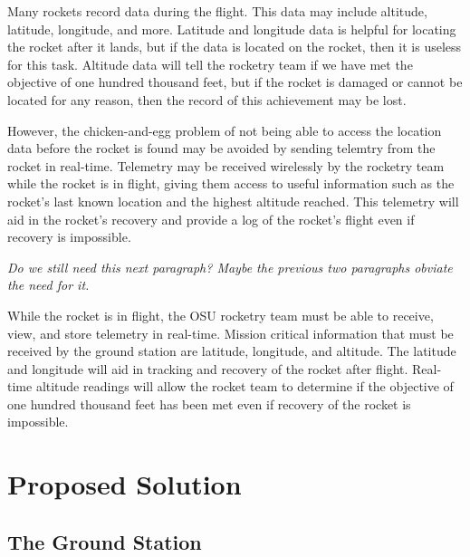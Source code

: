 \documentclass[10pt,journal,draftclsnofoot,onecolumn]{IEEEtran}
\begin{document}
	Many rockets record data during the flight. This data may include
	altitude, latitude, longitude, and more.
	Latitude and longitude
	data is helpful for locating the rocket after it lands, but
	if the data is located on the rocket, then it is useless
	for this task.
	Altitude data will tell the rocketry team if we have
	met the objective of one hundred thousand feet, but if the rocket
	is damaged or cannot be located for any reason, then the record
	of this achievement may be lost.

	However, the chicken-and-egg problem of not being able to access
	the location data before the rocket is found may be avoided by sending
	telemtry from the rocket in real-time.
	Telemetry may be received wirelessly
	by the rocketry team while the rocket is in flight, giving them
	access to useful information such as the rocket's last known location
	and the highest altitude reached. This telemetry will aid in the
	rocket's recovery and provide a log of the rocket's flight even if
	recovery is impossible.

	{\textit{\color{red} Do we still need this next paragraph? Maybe the previous two paragraphs obviate the need for it.}}

	While the rocket is in flight, the \ac{OSU} rocketry team
	must be able to receive, view, and store telemetry in real-time.
	Mission critical information that must be received by the ground
	station are latitude, longitude, and altitude. The latitude
	and longitude will aid in tracking and recovery of the rocket
	after flight. Real-time altitude readings will allow the rocket
	team to determine if the objective of one hundred thousand feet
	has been met even if recovery of the rocket is impossible.
	
	
	\section{Proposed Solution}

	\subsection{The Ground Station}
\end{document}
